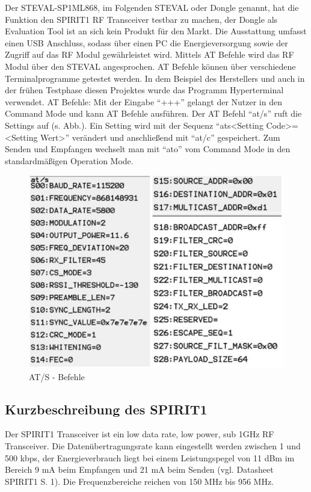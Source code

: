 \documentclass[a4paper, 12.5pt]{scrartcl}
\begin{document}
Der STEVAL-SP1ML868, im Folgenden STEVAL oder Dongle genannt, hat die Funktion den SPIRIT1 RF Transceiver testbar zu machen, der Dongle als Evaluation Tool ist an sich kein Produkt für den Markt. Die Ausstattung umfasst einen USB Anschluss, sodass über einen PC die Energieversorgung sowie der Zugriff auf das RF Modul gewährleistet wird. Mittels AT Befehle wird das RF Modul über den STEVAL angesprochen. AT Befehle können über verschiedene Terminalprogramme getestet werden. In dem Beispiel des Herstellers und auch in der frühen Testphase diesen Projektes wurde das Programm Hyperterminal verwendet.
AT Befehle:	Mit der Eingabe “+++” gelangt der Nutzer in den Command Mode und kann AT Befehle ausführen. Der AT Befehl “at/s” ruft die Settings auf (s. Abb.). Ein Setting wird mit der Sequenz “ats<Setting Code>=<Setting Wert>” verändert und anschließend mit “at/c” gespeichert. Zum Senden und Empfangen wechselt man mit “ato” vom Command Mode in den standardmäßigen Operation Mode.
\begin{figure}[h]
	\centering
	\includegraphics[scale=1.0]{at.jpg}
	\caption{AT/S - Befehle}
	\label{img:ats}
\end{figure}
\newpage
\subsection{Kurzbeschreibung des SPIRIT1} 

Der SPIRIT1 Transceiver ist ein low data rate, low power, sub 1GHz RF Transceiver. Die Datenübertragungsrate kann eingestellt werden zwischen 1 und 500 kbps, der Energieverbrauch liegt bei einem Leistungspegel von 11 dBm im Bereich 9 mA beim Empfangen und 21 mA beim Senden (vgl. Datasheet SPIRIT1 S. 1). Die Frequenzbereiche reichen von 150 MHz bis 956 MHz. 
\end{document}
